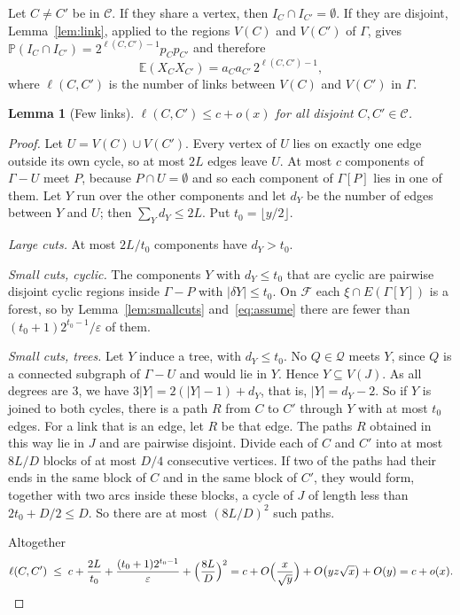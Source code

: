 \documentclass[11pt]{article}
\newtheorem{lemma}[theorem]{Lemma}
\theoremstyle{definition}
\theoremstyle{remark}
\newcommand{\PP}{\mathbb{P}}
\newcommand{\EE}{\mathbb{E}}
\numberwithin{equation}{section}
\begin{document}
Let $C\ne C'$ be in $\mathcal{C}$. If they share a vertex, then $I_C\cap I_{C'}=\emptyset$. If they
are disjoint, Lemma~\ref{lem:link}, applied to the regions $V(C)$ and $V(C')$ of $\Gamma$, gives
$\PP(I_C\cap I_{C'})=2^{\ell(C,C')-1}p_Cp_{C'}$ and therefore
\begin{equation}\label{eq:pair}
  \EE(X_CX_{C'})=a_Ca_{C'}\,2^{\ell(C,C')-1},
\end{equation}
where $\ell(C,C')$ is the number of links between $V(C)$ and $V(C')$ in $\Gamma$.

\begin{lemma}[Few links]\label{lem:links}
$\ell(C,C')\le c+o(x)$ for all disjoint $C,C'\in\mathcal{C}$.
\end{lemma}

\begin{proof}
Let $U=V(C)\cup V(C')$. Every vertex of $U$ lies on exactly one edge outside its own cycle, so at
most $2L$ edges leave $U$. At most $c$ components of $\Gamma-U$ meet $P$, because $P\cap U=\emptyset$
and so each component of $\Gamma[P]$ lies in one of them. Let $Y$ run over the other components and
let $d_Y$ be the number of edges between $Y$ and $U$; then $\sum_Yd_Y\le2L$. Put
$t_0=\lfloor y/2\rfloor$.

\emph{Large cuts.} At most $2L/t_0$ components have $d_Y>t_0$.

\emph{Small cuts, cyclic.} The components $Y$ with $d_Y\le t_0$ that are cyclic are pairwise
disjoint cyclic regions inside $\Gamma-P$ with $|\delta Y|\le t_0$. On $\mathcal{F}$ each
$\xi\cap E(\Gamma[Y])$ is a forest, so by Lemma~\ref{lem:smallcuts} and~\eqref{eq:assume} there are
fewer than $(t_0+1)2^{t_0-1}/\varepsilon$ of them.

\emph{Small cuts, trees.} Let $Y$ induce a tree, with $d_Y\le t_0$. No $Q\in\mathcal{Q}$ meets $Y$,
since $Q$ is a connected subgraph of $\Gamma-U$ and would lie in $Y$. Hence $Y\subseteq V(J)$. As
all degrees are $3$, we have $3|Y|=2(|Y|-1)+d_Y$, that is, $|Y|=d_Y-2$. So if $Y$ is joined to both
cycles, there is a path $R$ from $C$ to $C'$ through $Y$ with at most $t_0$ edges. For a link that
is an edge, let $R$ be that edge. The paths $R$ obtained in this way lie in $J$ and are pairwise
disjoint. Divide each of $C$ and $C'$ into at most $8L/D$ blocks of at most $D/4$ consecutive
vertices. If two of the paths had their ends in the same block of $C$ and in the same block of $C'$,
they would form, together with two arcs inside these blocks, a cycle of $J$ of length less than
$2t_0+D/2\le D$. So there are at most $(8L/D)^{2}$ such paths.

Altogether
\[
  \ell(C,C')\;\le\;c+\frac{2L}{t_0}+\frac{(t_0+1)2^{t_0-1}}{\varepsilon}+\Bigl(\frac{8L}{D}\Bigr)^{2}
  =c+O\Bigl(\frac{x}{\sqrt y}\Bigr)+O\bigl(yz\sqrt x\bigr)+O(y)=c+o(x).\qedhere
\]
\end{proof}
\end{document}
